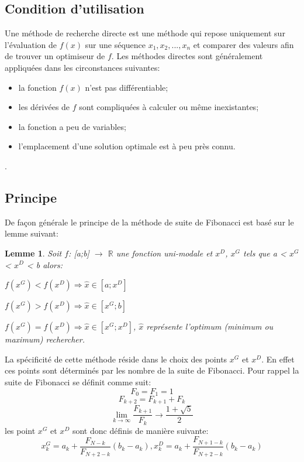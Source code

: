 \documentclass[a4paper,14pt]{article}
\newtheorem*{lemma}{Lemme}
\begin{document}
\subsection{Condition d'utilisation}

Une méthode de recherche directe est une méthode qui repose uniquement sur l'évaluation de $f(x)$ sur une
séquence $x_{1}, x_{2},..., x_{n}$ et comparer des valeurs afin de trouver un optimiseur de $f$.
Les méthodes directes sont généralement appliquées dans les circonstances suivantes:
\begin{itemize} 
	\item la fonction $f(x)$ n'est pas différentiable;
    \item les dérivées de $f$ sont compliquées à calculer ou même inexistantes;
    \item la fonction a peu de variables;
    \item l'emplacement d'une solution optimale est à peu près connu.   
\end{itemize}.

\subsection{Principe}

De façon générale le principe de la méthode de suite de Fibonacci est basé sur le lemme suivant:

\begin{lemma}
Soit $f$: [a;b] $\longrightarrow$ $\mathbb{R}$ une fonction uni-modale et $x^{D}$, $x^{G}$ tels que a < $x^{G}$ < $x^{D}$ < b alors:

\begin{list}{•}{ }
\item$f(x^{G}) < f(x^{D}) \Longrightarrow \widehat{x} \in [a; x^{D}]$
\item$f(x^{G}) > f(x^{D}) \Longrightarrow \widehat{x} \in [x^{G}; b]$
\item$f(x^{G}) = f(x^{D}) \Longrightarrow \widehat{x} \in [x^{G}; x^{D}]$, $\widehat{x}$ représente l'optimum (minimum ou maximum) rechercher.
\end{list}

\end{lemma}

La spécificité de cette méthode réside dans le choix des points $x^{G}$ et $x^{D}$. En effet ces points sont déterminés par les nombre de la suite de Fibonacci. Pour rappel la suite de Fibonacci se définit comme suit:
	\[F_{0} = F_{1} = 1\]
	\[F_{k+2} = F_{k+1} + F_{k}\]
	\[\lim_{k\rightarrow\infty} \frac{F_{k+1}}{F_{k}} \longrightarrow \frac{1+\sqrt{5}}{2}\]
les point $x^{G}$ et $x^{D}$ sont donc définis de manière suivante: 
\[
	x^{G}_{k} = a_{k} + \frac{F_{N-k}}{F_{N+2-k}}(b_{k} - a_{k}), x^{D}_{k} = a_{k} + \frac{F_{N+1-k}}{F_{N+2-k}}(b_{k} - a_{k})
\]
\end{document}
